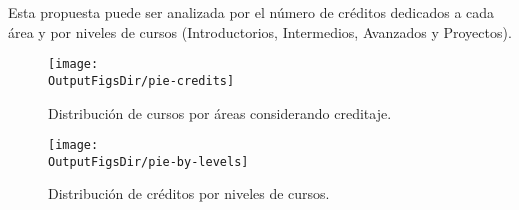 Esta propuesta puede ser analizada por el número de créditos dedicados a cada área
y por niveles de cursos (Introductorios, Intermedios, Avanzados y Proyectos).
\vspace{0.5cm}

\begin{figure}[h!]
      \centering
      \texttt{[image: \\OutputFigsDir/pie-credits]}
      \label{fig:pie-credits}
      \caption{Distribución de cursos por áreas considerando creditaje.}
\end{figure}

% 


\begin{figure}[h!]
      \centering
      \texttt{[image: \\OutputFigsDir/pie-by-levels]}
      \label{fig:pie-niveles}
      \caption{Distribución de créditos por niveles de cursos.}
\end{figure}